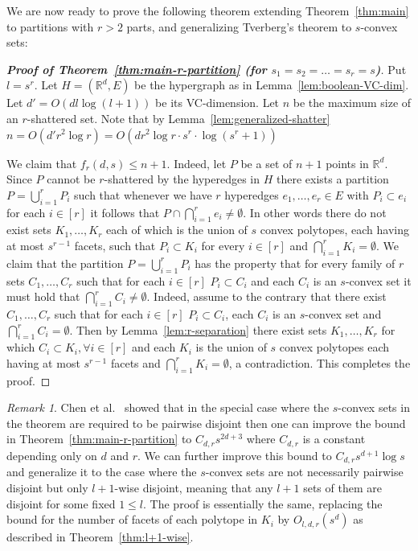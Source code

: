 \documentclass[11pt]{article}
\def\Re{\mathbb R}
\theoremstyle{plain}
\theoremstyle{definition}
\theoremstyle{remark}
\newtheorem{remark}[theorem]{Remark}
\begin{document}
We are now ready to prove the following theorem extending
Theorem~\ref{thm:main} to partitions with $r > 2$
parts, and generalizing
Tverberg's theorem to $s$-convex sets:


\begin{proof}[\bf Proof of Theorem~\ref{thm:main-r-partition} (for $s_1=s_2=\ldots =s_r=s$)]
    Put $l = s^r$. Let  $H=(\Re^d,E)$ be the hypergraph as in
    Lemma~\ref{lem:boolean-VC-dim}. Let $d'=O(d l \log (l+1))$ be its VC-dimension. Let $n$ be the maximum size of
    an $r$-shattered set. Note that by Lemma~\ref{lem:generalized-shatter}
    $n = O(d' r^2 \log r)= O(d r^2 {\log r} \cdot  s^r \cdot {\log (s^r +1)} )$

    We claim that $f_r(d,s) \leq n+1$. Indeed, let $P$ be a set of
    $n+1$ points in $\Re^d$. Since $P$ cannot be $r$-shattered by the
    hyperedges in $H$ there exists a partition $P= \bigcup_{i=1}^r P_i$
    such that whenever we have $r$ hyperedges $e_1,\ldots,e_r  \in E$
    with $P_i \subset e_i$ for each $i \in [r]$ it follows that $P \cap
    \bigcap_{i=1}^r e_i \neq \emptyset$. In other words there do not
    exist sets $K_1,\ldots,K_r$ each of which is the union of $s$ convex
	polytopes, each having at most $s^{r-1}$ facets,
	such that $P_i \subset
    K_i$ for every $i \in [r]$ and $\bigcap_{i=1}^r K_i = \emptyset$. We
    claim that the partition $P=\bigcup_{i=1}^r P_i$ has the property
    that for every family of $r$ sets $C_1,\ldots, C_r$ such that for each
    $i \in [r]$ $P_i \subset C_i$ and each $C_i$ is an $s$-convex set
    it must hold that $\bigcap_{i=1}^r C_i \neq \emptyset$. Indeed,
    assume to the contrary that there exist $C_1,\ldots, C_r$ such
    that for each $i \in [r]$ $P_i \subset C_i$, each $C_i$ is an
    $s$-convex set and $\bigcap_{i=1}^r C_i = \emptyset$. Then
    by Lemma~\ref{lem:r-separation} there exist sets $K_1,\ldots,K_r$
    for which  $C_i \subset K_i, \forall i \in [r]$ and each $K_i$ is the
	union of $s$ convex polytopes each having at most $s^{r-1}$ 
	facets and
    $\bigcap_{i=1}^r K_i = \emptyset$, a contradiction. This completes
    the proof.
\end{proof}
\begin{remark}
    Chen et al.~\cite{ChenETAL2025} showed that in the special case 
	where the $s$-convex sets in the theorem are required to be 
	pairwise disjoint then one can improve the bound in 
	Theorem~\ref{thm:main-r-partition} to $C_{d,r}s^{2d+3}$ 
	where $C_{d,r}$ is a constant depending only on $d$ and $r$. 
	We can further improve this bound to $C_{d,r}s^{d+1} \log s$ 
	and generalize it to the case where the $s$-convex sets are 
	not necessarily pairwise disjoint but only $l+1$-wise 
	disjoint, meaning that any $l+1$ sets of them are disjoint 
	for some fixed $1 \leq l$. The proof is essentially the
	same, replacing
	the bound for the number of facets of each polytope in
	$K_i$ by $O_{l,d,r}(s^{d})$ as described in 
	Theorem~\ref{thm:l+1-wise}.
\end{remark}
\end{document}
